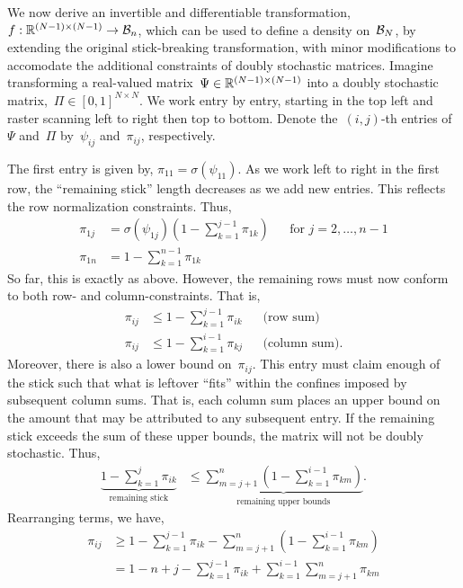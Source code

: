 \documentclass{article}
\begin{document}
We now derive an invertible and differentiable transformation,~$f: \mathbb{R}^{(N-1) \times (N-1)} \to \mathcal{B}_n$,
which can be used to define a density on~$\mathcal{B}_N$, by extending the original stick-breaking transformation, with minor
modifications to accomodate the additional constraints of doubly stochastic
matrices. Imagine transforming a real-valued matrix~$\Psi \in \mathbb{R}^{(N-1) \times (N-1)}$
into a doubly stochastic matrix,~${\Pi} \in [0,1]^{N \times N}$.
We work entry by entry, starting in the top left
and raster scanning left to right then top to bottom. Denote the~$(i,j)$-th entries
of~$\Psi$ and~${\Pi}$ by~$\psi_{ij}$ and~${\pi}_{ij}$, respectively.

The first entry is given by, ${\pi}_{11} = \sigma(\psi_{11})$.
As we work left to right in the first row, the ``remaining stick'' length
decreases as we add new entries. This reflects the row normalization constraints.
Thus,
\begin{align}
  {\pi}_{1j} &= \sigma(\psi_{1j}) (1 - \sum_{k=1}^{j-1} {\pi}_{1k})  & &  \text{for } j=2, \ldots, n-1\\
  {\pi}_{1n} &= 1 - \sum_{k=1}^{n-1} {\pi}_{1k}
\end{align}
So far, this is exactly as above. However, the remaining rows must now
conform to both row- and column-constraints. That is,
\begin{align}
{\pi}_{ij} &\leq 1- \sum_{k=1}^{j-1} {\pi}_{ik} & & \text{(row sum)} \\
{\pi}_{ij} &\leq 1- \sum_{k=1}^{i-1} {\pi}_{kj} & & \text{(column sum)}.
\end{align}
Moreover, there is also a lower bound on~${\pi}_{ij}$. This entry must
claim enough of the stick such that what is leftover ``fits'' within the confines
imposed by subsequent column sums. That is, each column sum places an upper
bound on the amount that may be attributed to any subsequent entry. If the remaining
stick exceeds the sum of these upper bounds, the matrix will not be doubly stochastic.
Thus,
\begin{align}
\underbrace{1 - \sum_{k=1}^j \pi_{ik}}_{\text{remaining stick}}
&\leq \underbrace{\sum_{m=j+1}^n (1- \sum_{k=1}^{i-1} {\pi}_{km})}_{\text{remaining upper bounds}}.
\end{align}
Rearranging terms, we have,
\begin{align}
\pi_{ij} &\geq 1- \sum_{k=1}^{j-1} \pi_{ik} - \sum_{m=j+1}^n (1- \sum_{k=1}^{i-1} {\pi}_{km}) \\
&= 1 - n + j - \sum_{k=1}^{j-1} \pi_{ik}  +  \sum_{k=1}^{i-1} \sum_{m=j+1}^n {\pi}_{km}
\end{align}
\end{document}
